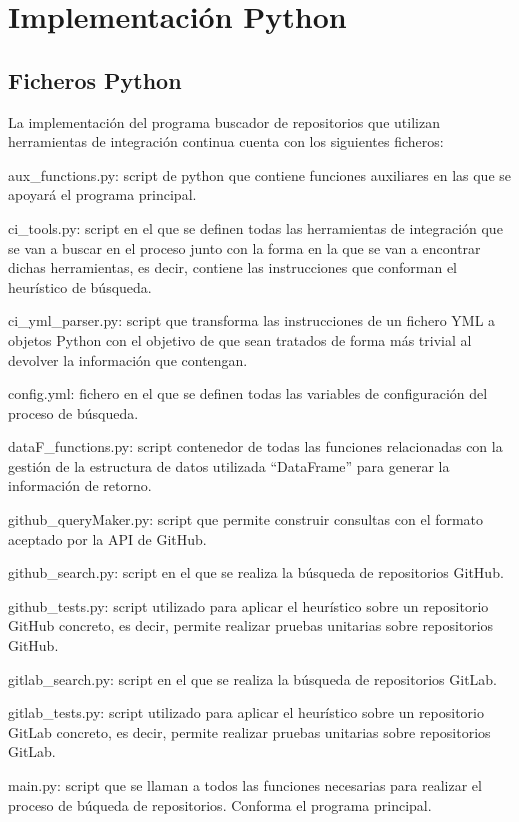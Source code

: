 \section{Implementación Python}

\subsection{Ficheros Python}
La implementación del programa buscador de repositorios que utilizan herramientas de integración continua cuenta con los siguientes ficheros:
\begin{compactitem}
    \item aux\_functions.py: script de python que contiene funciones auxiliares en las que se apoyará el programa principal.
    \item ci\_tools.py: script en el que se definen todas las herramientas de integración que se van a buscar en el proceso junto con la forma en la que se van a encontrar dichas herramientas, es decir, contiene las instrucciones que conforman el heurístico de búsqueda.
    \item ci\_yml\_parser.py: script que transforma las instrucciones de un fichero YML a objetos Python con el objetivo de que sean tratados  de forma más trivial al devolver la información que contengan.
    \item config.yml: fichero en el que se definen todas las variables de configuración del proceso de búsqueda.
    \item dataF\_functions.py: script contenedor de todas las funciones relacionadas con la gestión de la estructura de datos utilizada ``DataFrame'' para generar la información de retorno.
    \item github\_queryMaker.py: script que permite construir consultas con el formato aceptado por la API de GitHub.
    \item github\_search.py: script en el que se realiza la búsqueda de repositorios GitHub.
    \item github\_tests.py: script utilizado para aplicar el heurístico sobre un repositorio GitHub concreto, es decir, permite realizar pruebas unitarias sobre repositorios GitHub.
    \item gitlab\_search.py: script en el que se realiza la búsqueda de repositorios GitLab.
    \item gitlab\_tests.py: script utilizado para aplicar el heurístico sobre un repositorio GitLab concreto, es decir, permite realizar pruebas unitarias sobre repositorios GitLab.
    \item main.py: script que se llaman a todos las funciones necesarias para realizar el proceso de búqueda de repositorios. Conforma el programa principal.
\end{compactitem}

